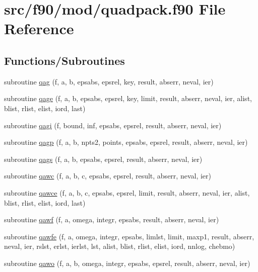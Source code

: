 \hypertarget{quadpack_8f90}{
\section{src/f90/mod/quadpack.f90 File Reference}
\label{quadpack_8f90}
}
\subsection*{Functions/Subroutines}
\begin{DoxyCompactItemize}
\item 
subroutine \hyperlink{quadpack_8f90_a44906a25a31588f7e4f41f0e5253193a}{qag} (f, a, b, epsabs, epsrel, key, result, abserr, neval, ier)
\item 
subroutine \hyperlink{quadpack_8f90_ab602437c218a2c74d6a13f9462f98854}{qage} (f, a, b, epsabs, epsrel, key, limit, result, abserr, neval, ier, alist, blist, rlist, elist, iord, last)
\item 
subroutine \hyperlink{quadpack_8f90_ac59eaf7c56c1d421d129425895fa0107}{qagi} (f, bound, inf, epsabs, epsrel, result, abserr, neval, ier)
\item 
subroutine \hyperlink{quadpack_8f90_a99cf2a02a14029fad4762555f04cac0e}{qagp} (f, a, b, npts2, points, epsabs, epsrel, result, abserr, neval, ier)
\item 
subroutine \hyperlink{quadpack_8f90_a00a116a91c0699e57d15abc61dcd531b}{qags} (f, a, b, epsabs, epsrel, result, abserr, neval, ier)
\item 
subroutine \hyperlink{quadpack_8f90_a4cea9ad83248026209e702bb01abb7da}{qawc} (f, a, b, c, epsabs, epsrel, result, abserr, neval, ier)
\item 
subroutine \hyperlink{quadpack_8f90_a51d7f754a9214f7490c035740fc0aef7}{qawce} (f, a, b, c, epsabs, epsrel, limit, result, abserr, neval, ier, alist, blist, rlist, elist, iord, last)
\item 
subroutine \hyperlink{quadpack_8f90_aefd54eff8d0418a0f533f571d80ec5e5}{qawf} (f, a, omega, integr, epsabs, result, abserr, neval, ier)
\item 
subroutine \hyperlink{quadpack_8f90_abe17af7f3ad5cf264791d326bbd15192}{qawfe} (f, a, omega, integr, epsabs, limlst, limit, maxp1, result, abserr, neval, ier, rslst, erlst, ierlst, lst, alist, blist, rlist, elist, iord, nnlog, chebmo)
\item 
subroutine \hyperlink{quadpack_8f90_aaa4f15baf0dadd3383219f0d42a62752}{qawo} (f, a, b, omega, integr, epsabs, epsrel, result, abserr, neval, ier)

\end{DoxyCompactItemize}
